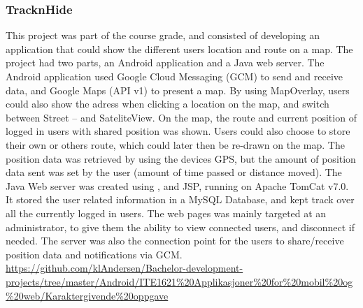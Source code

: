 \subsubsection{TracknHide}
\label{sec:tracknhide}
This project was part of the course grade, and consisted of developing an application that could show the different users location and route on a map. 
The project had two parts, an Android application and a Java web server.
\vspace{0.5em}\newline
The Android application used Google Cloud Messaging (GCM) to send and receive data, and Google Maps (API v1) to present a map. 
By using MapOverlay, users could also show the adress when clicking a location on the map, and switch between Street – and SateliteView. 
On the map, the route and current position of logged in users with shared position was shown. 
Users could also choose to store their own or others route, which could later then be re-drawn on the map. 
The position data was retrieved by using the devices GPS, but the amount of position data sent was set by the user (amount of time passed or distance moved).
\vspace{0.5em}\newline
The Java Web server was created using ,  and JSP, running on Apache TomCat v7.0. 
It stored the user related information in a MySQL Database, and kept track over all the currently logged in users. 
The web pages was mainly targeted at an administrator, to give them the ability to view connected users, and disconnect if needed. 
The server was also the connection point for the users to share/receive position data and notifications via GCM. 
\clearpage\noindent
{} \url{https://github.com/klAndersen/Bachelor-development-projects/tree/master/Android/ITE1621%20Applikasjoner%20for%20mobil%20og%20web/Karaktergivende%20oppgave} 

